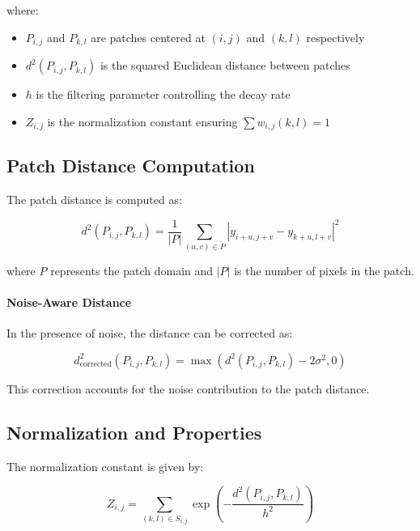 \documentclass[12pt]{article}
\begin{document}
where:
\begin{itemize}
    \item $P_{i,j}$ and $P_{k,l}$ are patches centered at $(i,j)$ and $(k,l)$ respectively
    \item $d^2(P_{i,j}, P_{k,l})$ is the squared Euclidean distance between patches
    \item $h$ is the filtering parameter controlling the decay rate
    \item $Z_{i,j}$ is the normalization constant ensuring $\sum w_{i,j}(k,l) = 1$
\end{itemize}

\subsection{Patch Distance Computation}
\label{subsec:patch_distance}

The patch distance is computed as:

\begin{equation}
    \label{eq:patch_distance}
    d^2(P_{i,j}, P_{k,l}) = \frac{1}{|P|} \sum_{(u,v) \in P} |y_{i+u,j+v} - y_{k+u,l+v}|^2
\end{equation}

where $P$ represents the patch domain and $|P|$ is the number of pixels in the patch.

\paragraph{Noise-Aware Distance}
In the presence of noise, the distance can be corrected as:

\begin{equation}
    \label{eq:noise_corrected_distance}
    d^2_{\text{corrected}}(P_{i,j}, P_{k,l}) = \max\left(d^2(P_{i,j}, P_{k,l}) - 2\sigma^2, 0\right)
\end{equation}

This correction accounts for the noise contribution to the patch distance.

\subsection{Normalization and Properties}
\label{subsec:nlm_properties}

The normalization constant is given by:

\begin{equation}
    \label{eq:normalization}
    Z_{i,j} = \sum_{(k,l) \in S_{i,j}} \exp\left(-\frac{d^2(P_{i,j}, P_{k,l})}{h^2}\right)
\end{equation}
\end{document}
